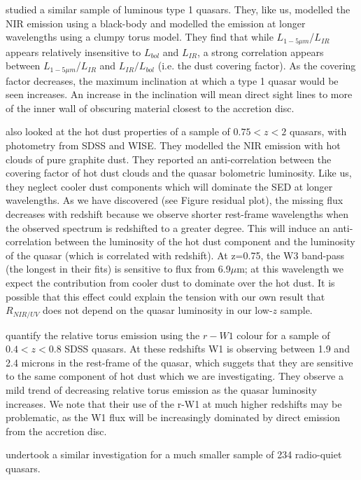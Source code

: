 \citet{roseboom13} studied a similar sample of luminous type 1 quasars. 
They, like us, modelled the NIR emission using a black-body and modelled the emission at longer wavelengths using a clumpy torus model. 
They find that while $L_{1-5\mu m}$/$L_{IR}$ appears relatively insensitive to $L_{bol}$ and $L_{IR}$, a strong correlation appears between $L_{1-5\mu m}$/$L_{IR}$ and $L_{IR}/L_{bol}$ (i.e. the dust covering factor). 
As the covering factor decreases, the maximum inclination at which a type 1 quasar would be seen increases. 
An increase in the inclination will mean direct sight lines to more of the inner wall of obscuring material closest to the accretion disc.

\citet{mor11} also looked at the hot dust properties of a sample of $0.75 < z < 2$ quasars, with photometry from SDSS and WISE. 
They modelled the NIR emission with hot clouds of pure graphite dust. 
They reported an anti-correlation between the covering factor of hot dust clouds and the quasar bolometric luminosity. 
Like us, they neglect cooler dust components which will dominate the SED at longer wavelengths. 
As we have discovered (see Figure residual plot), the missing flux decreases with redshift because we observe shorter rest-frame wavelengths when the observed spectrum is redshifted to a greater degree. 
This will induce an anti-correlation between the luminosity of the hot dust component and the luminosity of the quasar (which is correlated with redshift). 
At z=0.75, the W3 band-pass (the longest in their fits) is sensitive to flux from 6.9$\mu$m; at this wavelength we expect the contribution from cooler dust to dominate over the hot dust. 
It is possible that this effect could explain the tension with our own result that $R_{NIR/UV}$ does not depend on the quasar luminosity in our low-$z$ sample. 

\citet{shen14} quantify the relative torus emission using the $r-W1$ colour for a sample of $0.4 < z < 0.8$ SDSS quasars. 
At these redshifts W1 is observing between 1.9 and 2.4 microns in the rest-frame of the quasar, which suggets that they are sensitive to the same component of hot dust which we are investigating. 
They observe a mild trend of decreasing relative torus emission as the quasar luminosity increases. 
We note that their use of the r-W1 at much higher redshifts may be problematic, as the W1 flux will be increasingly dominated by direct emission from the accretion disc. 

\citet{gallagher07} undertook a similar investigation for a much smaller sample of 234 radio-quiet quasars.


